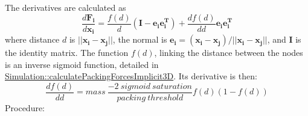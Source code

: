The derivatives are calculated as \[ \frac{d\mathbf{F_{i}}}{d\mathbf{x_{i}}} = \frac{f\left( d \right)}{d}\left( \mathbf{I} - \mathbf{e_{i}} \mathbf{e_{i}^{T}}\right) +\frac{df\left( d \right)}{dd} \mathbf{e_{i}} \mathbf{e_{i}^{T}} \] where distance $ d $ is $ ||\mathbf{x_{i}}-\mathbf{x_{j}} || $, the normal is $ \mathbf{e_{i}} = \left( \mathbf{x_{i}}-\mathbf{x_{j}} \right) / ||\mathbf{x_{i}}-\mathbf{x_{j}} || $, and $ \mathbf{I} $ is the identity matrix. The function $ f\left( d \right) $, linking the distance between the nodes is an inverse sigmoid function, detailed in \hyperlink{classSimulation_a77e76f4fe61889b9c0ae18436a7fd2fb}{Simulation\+::calculate\+Packing\+Forces\+Implicit3\+D}. Its derivative is then\+: \[ \frac{df\left( d \right)}{dd} = mass\:\frac{-2\:sigmoid\:saturation}{packing\:threshold} f\left( d \right) \left( 1 - f\left( d \right) \right) \] Procedure\+:


